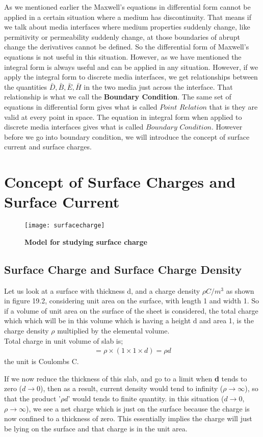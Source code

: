 As we mentioned earlier the Maxwell's equations in differential form cannot be applied in a certain situation where a medium has discontinuity. That means if we talk about media interfaces where medium properties suddenly change, like permitivity or permeability suddenly change, at those boundaries of abrupt change the derivatives cannot be defined. So the differential form of Maxwell's equations is not useful in this situation. However, as we have mentioned the integral form is always useful and can be applied in any situation. However, if we apply the integral form to discrete media interfaces, we get relationships between the quantities $\bar{D}, \bar{B}, \bar{E}, \bar{H}$ in the two media just across the interface. That relationship is what we call the \textbf{Boundary Condition}. The same set of equations in differential form gives what is called $Point$ $Relation$ that is they are valid at every point in space. The equation in integral form when applied to discrete media interfaces gives what is called $Boundary$ $Condition$. However before we go into boundary condition, we will introduce the concept of surface current and surface charges.
\\
 \section{Concept of Surface Charges and Surface Current}
 \begin{figure}[h]
 	\centering
 	\texttt{[image: surfacecharge]}
 	\caption{\textbf{Model for studying surface charge}}
 \end{figure} 
\subsection{Surface Charge and Surface Charge Density}
Let us look at a surface with thickness d, and a charge density $\rho$$C/m^{3}$ as shown in figure 19.2, considering  unit area on the surface, with length 1 and width 1. So if a volume of unit area on the surface of the sheet is considered, the total charge which which will be in this volume which is having a height d and area 1, is the charge density $\rho$ multiplied by the elemental volume.\\
Total charge in unit volume of slab is;
\begin{align*}
=\rho\times(1\times 1\times d)=\rho d
\end{align*}
 the unit is Coulombs C.
 
 
 If we now reduce the thickness of this slab, and go to a limit when \textbf{d} tends to zero ($d\rightarrow 0$), then as a result, current density would tend to infinity ($\rho\rightarrow\infty$), so that the product '$\rho d$' would tends to finite quantity. in this situation ($d\rightarrow 0$, $\rho\rightarrow\infty$), we see a net charge which is just on the surface because the charge is now confined to a thickness of zero. This essentially implies the charge will just be lying on the surface and that charge is in the unit area. 
 
